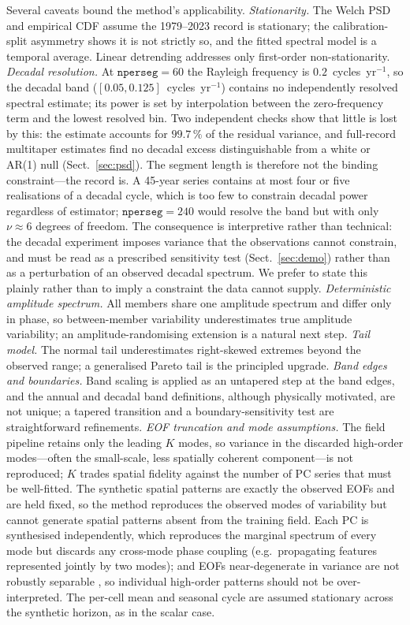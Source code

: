 Several caveats bound the method's applicability.
\emph{Stationarity.} The Welch PSD and empirical CDF assume the 1979--2023
record is stationary; the calibration-split asymmetry shows it is not
strictly so, and the fitted spectral model is a temporal average. Linear
detrending addresses only first-order non-stationarity.
\emph{Decadal resolution.} At $\texttt{nperseg}=60$ the Rayleigh frequency is
$0.2$~cycles~yr$^{-1}$, so the decadal band
($[0.05,0.125]$~cycles~yr$^{-1}$) contains no independently resolved
spectral estimate; its power is set by interpolation between the
zero-frequency term and the lowest resolved bin. Two independent checks show
that little is lost by this: the estimate accounts for $99.7\,\%$ of the
residual variance, and full-record multitaper estimates find no decadal
excess distinguishable from a white or AR(1) null (Sect.~\ref{sec:psd}). The
segment length is therefore not the binding constraint---the record is. A
45-year series contains at most four or five realisations of a decadal
cycle, which is too few to constrain decadal power regardless of estimator;
$\texttt{nperseg}=240$ would resolve the band but with only $\nu\approx6$
degrees of freedom. The consequence is interpretive rather than technical:
the decadal experiment imposes variance that the observations cannot
constrain, and must be read as a prescribed sensitivity test
(Sect.~\ref{sec:demo}) rather than as a perturbation of an observed decadal
spectrum. We prefer to state this plainly rather than to imply a constraint
the data cannot supply.
\emph{Deterministic amplitude spectrum.} All members share one amplitude
spectrum and differ only in phase, so between-member variability
underestimates true amplitude variability; an amplitude-randomising
extension is a natural next step.
\emph{Tail model.} The normal tail underestimates right-skewed extremes
beyond the observed range; a generalised Pareto tail \citep{coles2001} is
the principled upgrade.
\emph{Band edges and boundaries.} Band scaling is applied as an untapered
step at the band edges, and the annual and decadal band definitions,
although physically motivated, are not unique; a tapered transition and a
boundary-sensitivity test are straightforward refinements.
\emph{EOF truncation and mode assumptions.} The field pipeline retains only
the leading $K$ modes, so variance in the discarded high-order modes---often
the small-scale, less spatially coherent component---is not reproduced;
$K$ trades spatial fidelity against the number of PC series that must be
well-fitted. The synthetic spatial patterns are exactly the observed EOFs and
are held fixed, so the method reproduces the observed modes of variability but
cannot generate spatial patterns absent from the training field. Each PC is
synthesised independently, which reproduces the marginal spectrum of every
mode but discards any cross-mode phase coupling (e.g.\ propagating features
represented jointly by two modes); and EOFs near-degenerate in variance are
not robustly separable \citep{north1982}, so individual high-order patterns
should not be over-interpreted. The per-cell mean and seasonal cycle are
assumed stationary across the synthetic horizon, as in the scalar case.


